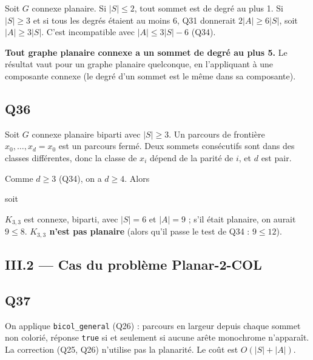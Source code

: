 \documentclass[11pt,a4paper]{article}
\newcommand{\equationajustee}[1]{%
  \sbox{\boiteequation}{$\displaystyle #1$}%
  \ifdim\wd\boiteequation>\linewidth
    \[\resizebox{\linewidth}{!}{\usebox{\boiteequation}}\]%
  \else
    \[#1\]%
  \fi}
\begin{document}
Soit \(G\) connexe planaire. Si \(|S| \le 2\), tout sommet est de degré au plus 1. Si \(|S| \ge 3\) et si tous les degrés étaient au moins 6, Q31 donnerait \(2|A| \ge 6|S|\), soit \(|A| \ge 3|S|\). C'est incompatible avec \(|A| \le 3|S| - 6\) (Q34).

\textbf{Tout graphe planaire connexe a un sommet de degré au plus 5.} Le résultat vaut
pour un graphe planaire quelconque, en l'appliquant à une composante connexe (le degré d'un sommet est le même dans sa composante).

\hypertarget{q36}{%
\subsection{Q36}\label{q36}}

Soit \(G\) connexe planaire biparti avec \(|S| \ge 3\). Un parcours de frontière \(x_0, \dots, x_d = x_0\) est un parcours fermé. Deux sommets consécutifs sont dans des classes différentes, donc la classe de \(x_i\) dépend de la parité de \(i\), et \(d\) est pair.

Comme \(d \ge 3\) (Q34), on a \(d \ge 4\). Alors

\equationajustee{\begin{aligned}
2|A| &\ge 4|F| \\
&= 4(2 - |S| + |A|),
\end{aligned}}

soit

\equationajustee{\boxed{\,|A| \le 2|S| - 4\,}}

\(K_{3,3}\) est connexe, biparti, avec \(|S| = 6\) et \(|A| = 9\) ; s'il était planaire, on aurait \(9 \le 8\). \textbf{\(K_{3,3}\) n'est pas planaire} (alors qu'il passe le test de Q34 : \(9 \le 12\)).

\hypertarget{iii.2-cas-du-probluxe8me-planar-2-col}{%
\subsection{III.2 --- Cas du problème Planar-2-COL}\label{iii.2-cas-du-probluxe8me-planar-2-col}}

\hypertarget{q37}{%
\subsection{Q37}\label{q37}}

On applique \texttt{bicol\_general} (Q26) : parcours en largeur depuis chaque sommet non colorié, réponse \texttt{true} si et seulement si aucune arête monochrome n'apparaît. La correction (Q25, Q26) n'utilise pas la planarité. Le coût est \(O(|S| + |A|)\).
\end{document}

